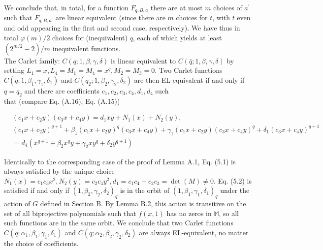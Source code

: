 \documentclass[10pt]{article}
\begin{document}
We conclude that, in total, for a function $F_{q, B, a}$ there are at most $m$ choices of $a^{\prime}$ such that $F_{q, B, a^{\prime}}$ are linear equivalent (since there are $m$ choices for $t$, with $t$ even and odd appearing in the first and second case, respectively). We have thus in total $\varphi(m) / 2$ choices for (inequivalent) $q$, each of which yields at least $\left(2^{m / 2}-2\right) / m$ inequivalent functions.\\
The Carlet family: $C(q ; 1, \beta, \gamma, \delta)$ is linear equivalent to $C(\bar{q} ; 1, \beta, \gamma, \delta)$ by setting $L_{1}=x, L_{4}= M_{1}=M_{4}=x^{\bar{q}}, M_{2}=M_{3}=0$. Two Carlet functions $C\left(q ; 1, \beta_{1}, \gamma_{1}, \delta_{1}\right)$ and $C\left(q_{2} ; 1, \beta_{2}, \gamma_{2}, \delta_{2}\right)$ are then EL-equivalent if and only if $q=q_{2}$ and there are coefficients $c_{1}, c_{2}, c_{3}, c_{4}, d_{1}, d_{4}$ such\\
that (compare Eq. (A.16), Eq. (A.15))


\begin{align*}
& \left(c_{1} x+c_{2} y\right)\left(c_{3} x+c_{4} y\right)=d_{1} x y+N_{1}(x)+N_{2}(y),  \tag{5.1}\\
& \left(c_{1} x+c_{2} y\right)^{q+1}+\beta_{1}\left(c_{1} x+c_{2} y\right)^{q}\left(c_{3} x+c_{4} y\right)+\gamma_{1}\left(c_{1} x+c_{2} y\right)\left(c_{3} x+c_{4} y\right)^{q}+\delta_{1}\left(c_{3} x+c_{4} y\right)^{q+1} \\
& =d_{4}\left(x^{q+1}+\beta_{2} x^{q} y+\gamma_{2} x y^{q}+\delta_{2} y^{q+1}\right) \tag{5.2}
\end{align*}


Identically to the corresponding case of the proof of Lemma A.1, Eq. (5.1) is always satisfied by the unique choice $N_{1}(x)=c_{1} c_{3} x^{2}, N_{2}(y)=c_{2} c_{4} y^{2}, d_{1}=c_{1} c_{4}+c_{2} c_{3}=\operatorname{det}(M) \neq 0$. Eq. (5.2) is satisfied if and only if $\left(1, \beta_{2}, \gamma_{2}, \delta_{2}\right)_{q}$ is in the orbit of $\left(1, \beta_{1}, \gamma_{1}, \delta_{1}\right)_{q}$ under the action of $G$ defined in Section B. By Lemma B.2, this action is transitive on the set of all biprojective polynomials such that $f(x, 1)$ has no zeros in $\mathbb{M}$, so all such functions are in the same orbit. We conclude that two Carlet functions $C\left(q ; \alpha_{1}, \beta_{1}, \gamma_{1}, \delta_{1}\right)$ and $C\left(q ; \alpha_{2}, \beta_{2}, \gamma_{2}, \delta_{2}\right)$ are always EL-equivalent, no matter the choice of coefficients.
\end{document}
